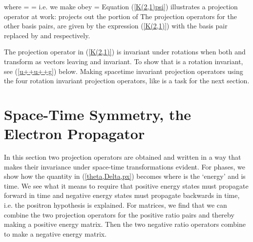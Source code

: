 \documentclass[a4paper,12pt]{article}
\begin{document}
where \coordHE{} = \coordHE{} = \coordHE{} i.e. we make \coordHE{} obey \coordHE{} = \coordHE{}  Equation (\ref{K(2,1)psi}) illustrates a projection operator at work: \coordHE{} projects out the \coordHE{} portion of \coordHE{} The projection operators for the other basis pairs, \coordHE{}  \coordHE{}  \coordHE{} are given by the expression (\ref{K(2,1)}) with the basis pair \coordHE{} replaced by \coordHE{}  \coordHE{} and \coordHE{} respectively.

	The projection operator \coordHE{} in (\ref{K(2,1)}) is invariant under rotations when both \coordHE{} and \coordHE{} transform as vectors leaving \coordHE{} and \myHighlight{$\theta$}\coordHE{} invariant. To show that \coordHE{} is a rotation invariant, see (\ref{u++u++g}) below. Making spacetime invariant projection operators using the four rotation invariant projection operators, like \coordHE{} is a task for the next section.

\section{Space-Time Symmetry, the Electron Propagator} \label{space-time} %

	In this section two projection operators are obtained and written in a way that makes their invariance under space-time transformations evident. For phases, we show how the quantity \myHighlight{$\Delta$}\coordHE{} in (\ref{theta,Delta,px}) becomes \coordHE{} where \coordHE{} is the `energy' and \coordHE{} is time. We see what it means to require that positive energy states must propagate forward in time and negative energy states must propagate backwards in time, i.e. the positron hypothesis is explained. For matrices, we find that we can combine the two projection operators for the positive ratio pairs \coordHE{} and \coordHE{} thereby making a positive energy matrix. Then the two negative ratio operators combine to make a negative energy matrix.
\end{document}
